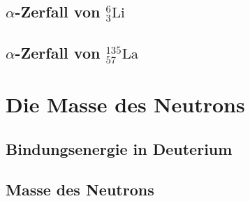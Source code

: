 \subsection{$\alpha$-Zerfall von $_3^6\text{Li}$}
\subsection{$\alpha$-Zerfall von $_{57}^{135}\text{La}$}

\section{Die Masse des Neutrons}
\subsection{Bindungsenergie in Deuterium}
\subsection{Masse des Neutrons}


